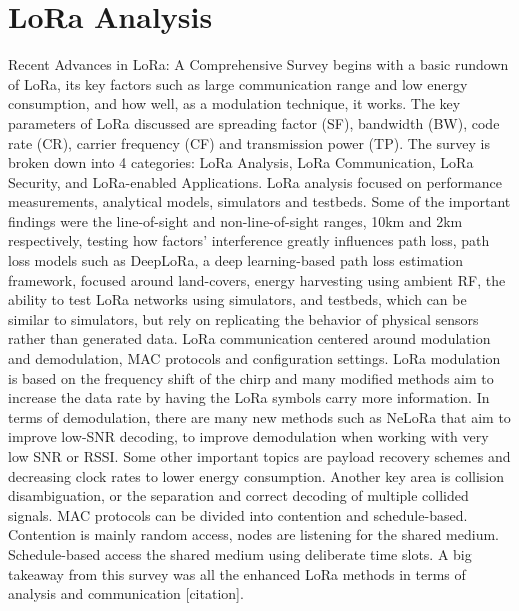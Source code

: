 \documentclass[sigsmall]{acmart}
\begin{document}
\section*{LoRa Analysis}
Recent Advances in LoRa: A Comprehensive Survey begins with a basic rundown of LoRa, its key factors such as large communication range and low energy consumption, and how well, as a modulation technique, it works. The key parameters of LoRa discussed are spreading factor (SF), bandwidth (BW), code rate (CR), carrier frequency (CF) and transmission power (TP). The survey is broken down into 4 categories: LoRa Analysis, LoRa Communication, LoRa Security, and LoRa-enabled Applications.
LoRa analysis focused on performance measurements, analytical models, simulators and testbeds. Some of the important findings were the line-of-sight and non-line-of-sight ranges, 10km and 2km respectively, testing how factors’ interference greatly influences path loss, path loss models such as DeepLoRa, a deep learning-based path loss estimation framework, focused around land-covers, energy harvesting using ambient RF, the ability to test LoRa networks using simulators, and testbeds, which can be similar to simulators, but rely on replicating the behavior of physical sensors rather than generated data.
LoRa communication centered around modulation and demodulation, MAC protocols and configuration settings. LoRa modulation is based on the frequency shift of the chirp and many modified methods aim to increase the data rate by having the LoRa symbols carry more information. In terms of demodulation, there are many new methods such as NeLoRa that aim to improve low-SNR decoding, to improve demodulation when working with very low SNR or RSSI. Some other important topics are payload recovery schemes and decreasing clock rates to lower energy consumption. Another key area is collision disambiguation, or the separation and correct decoding of multiple collided signals. MAC protocols can be divided into contention and schedule-based. Contention is mainly random access, nodes are listening for the shared medium. Schedule-based access the shared medium using deliberate time slots. A big takeaway from this survey was all the enhanced LoRa methods in terms of analysis and communication [citation].
\end{document}
